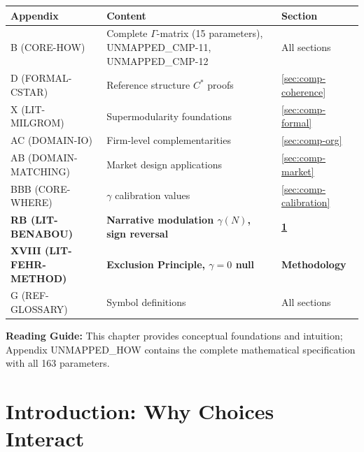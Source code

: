 \begin{tcolorbox}[
    colback=yellow!10!white,
    colframe=orange!75!black,
    title={\textbf{Appendix References for This Chapter}},
    fonttitle=\bfseries
]
\begin{tabular}{lll}
\textbf{Appendix} & \textbf{Content} & \textbf{Section} \\
\midrule
B (CORE-HOW) & Complete $\Gamma$-matrix (15 parameters), UNMAPPED_CMP-11, UNMAPPED_CMP-12 & All sections \\
D (FORMAL-CSTAR) & Reference structure $C^*$ proofs & \ref{sec:comp-coherence} \\
X (LIT-MILGROM) & Supermodularity foundations & \ref{sec:comp-formal} \\
AC (DOMAIN-IO) & Firm-level complementarities & \ref{sec:comp-org} \\
AB (DOMAIN-MATCHING) & Market design applications & \ref{sec:comp-market} \\
BBB (CORE-WHERE) & $\gamma$ calibration values & \ref{sec:comp-calibration} \\
\textbf{RB (LIT-BENABOU)} & \textbf{Narrative modulation $\gamma(N)$, sign reversal} & \textbf{\ref{sec:comp-intro}} \\
\textbf{XVIII (LIT-FEHR-METHOD)} & \textbf{Exclusion Principle, $\gamma = 0$ null} & \textbf{Methodology} \\
G (REF-GLOSSARY) & Symbol definitions & All sections
\end{tabular}

\medskip
\textbf{Reading Guide:} This chapter provides conceptual foundations and intuition;
Appendix UNMAPPED_HOW contains the complete mathematical specification with all 163 parameters.
\end{tcolorbox}



\section{Introduction: Why Choices Interact}
\label{sec:comp-intro}


